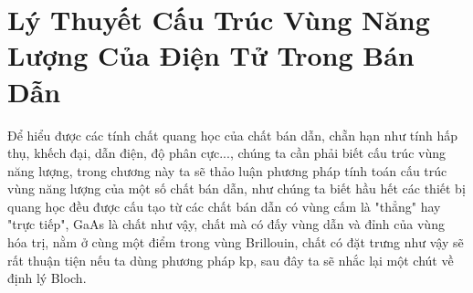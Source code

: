 \chapter{\bfseries Lý Thuyết Cấu Trúc Vùng Năng Lượng Của Điện Tử Trong Bán Dẫn}
\label{Chapter2} %
Để hiểu được các tính chất quang học của chất bán dẫn, chẵn hạn như tính hấp thụ, khếch đại, dẫn điện, độ phân cực..., chúng ta cần phải biết cấu trúc vùng năng lượng, trong chương này ta sẽ thảo luận phương pháp tính toán cấu trúc vùng năng lượng của  một số chất bán dẫn, như chúng ta biết hầu hết các thiết bị quang học đều được cấu tạo từ các chất bán dẫn có vùng cấm là "thẳng" hay "trực tiếp", GaAs là chất như vậy, chất mà có đấy vùng dẫn và đỉnh của vùng hóa trị, nằm ở cùng một điểm trong vùng Brillouin, chất có đặt trưng như vậy sẽ rất thuận tiện nếu ta dùng phương pháp kp, sau đây ta sẽ nhắc lại một chút về định lý Bloch.
